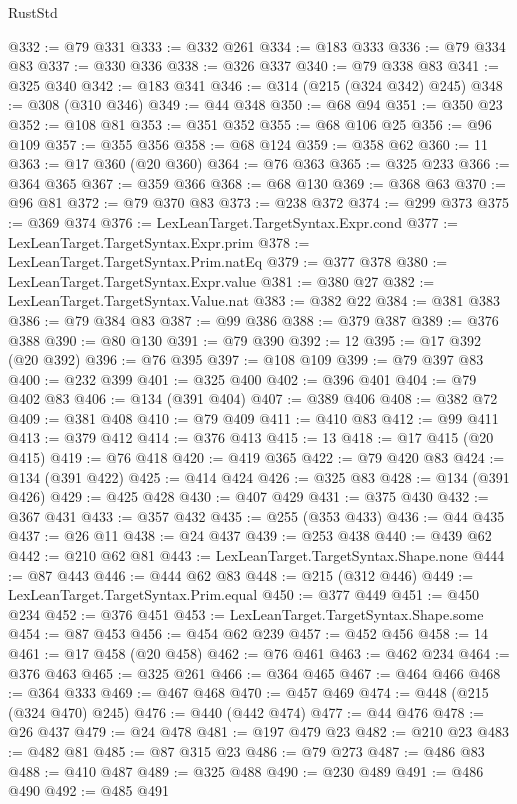 \begin{lexlean}{RustStd}
\begin{coremodule}
@332 := @79 @331
@333 := @332 @261
@334 := @183 @333
@336 := @79 @334 @83
@337 := @330 @336
@338 := @326 @337
@340 := @79 @338 @83
@341 := @325 @340
@342 := @183 @341
@346 := @314 (@215 (@324 @342) @245)
@348 := @308 (@310 @346)
@349 := @44 @348
@350 := @68 @94
@351 := @350 @23
@352 := @108 @81
@353 := @351 @352
@355 := @68 @106 @25
@356 := @96 @109
@357 := @355 @356
@358 := @68 @124
@359 := @358 @62
@360 := 11
@363 := @17 @360 (@20 @360)
@364 := @76 @363
@365 := @325 @233
@366 := @364 @365
@367 := @359 @366
@368 := @68 @130
@369 := @368 @63
@370 := @96 @81
@372 := @79 @370 @83
@373 := @238 @372
@374 := @299 @373
@375 := @369 @374
@376 := LexLeanTarget.TargetSyntax.Expr.cond
@377 := LexLeanTarget.TargetSyntax.Expr.prim
@378 := LexLeanTarget.TargetSyntax.Prim.natEq
@379 := @377 @378
@380 := LexLeanTarget.TargetSyntax.Expr.value
@381 := @380 @27
@382 := LexLeanTarget.TargetSyntax.Value.nat
@383 := @382 @22
@384 := @381 @383
@386 := @79 @384 @83
@387 := @99 @386
@388 := @379 @387
@389 := @376 @388
@390 := @80 @130
@391 := @79 @390
@392 := 12
@395 := @17 @392 (@20 @392)
@396 := @76 @395
@397 := @108 @109
@399 := @79 @397 @83
@400 := @232 @399
@401 := @325 @400
@402 := @396 @401
@404 := @79 @402 @83
@406 := @134 (@391 @404)
@407 := @389 @406
@408 := @382 @72
@409 := @381 @408
@410 := @79 @409
@411 := @410 @83
@412 := @99 @411
@413 := @379 @412
@414 := @376 @413
@415 := 13
@418 := @17 @415 (@20 @415)
@419 := @76 @418
@420 := @419 @365
@422 := @79 @420 @83
@424 := @134 (@391 @422)
@425 := @414 @424
@426 := @325 @83
@428 := @134 (@391 @426)
@429 := @425 @428
@430 := @407 @429
@431 := @375 @430
@432 := @367 @431
@433 := @357 @432
@435 := @255 (@353 @433)
@436 := @44 @435
@437 := @26 @11
@438 := @24 @437
@439 := @253 @438
@440 := @439 @62
@442 := @210 @62 @81
@443 := LexLeanTarget.TargetSyntax.Shape.none
@444 := @87 @443
@446 := @444 @62 @83
@448 := @215 (@312 @446)
@449 := LexLeanTarget.TargetSyntax.Prim.equal
@450 := @377 @449
@451 := @450 @234
@452 := @376 @451
@453 := LexLeanTarget.TargetSyntax.Shape.some
@454 := @87 @453
@456 := @454 @62 @239
@457 := @452 @456
@458 := 14
@461 := @17 @458 (@20 @458)
@462 := @76 @461
@463 := @462 @234
@464 := @376 @463
@465 := @325 @261
@466 := @364 @465
@467 := @464 @466
@468 := @364 @333
@469 := @467 @468
@470 := @457 @469
@474 := @448 (@215 (@324 @470) @245)
@476 := @440 (@442 @474)
@477 := @44 @476
@478 := @26 @437
@479 := @24 @478
@481 := @197 @479 @23
@482 := @210 @23
@483 := @482 @81
@485 := @87 @315 @23
@486 := @79 @273
@487 := @486 @83
@488 := @410 @487
@489 := @325 @488
@490 := @230 @489
@491 := @486 @490
@492 := @485 @491

\end{coremodule}
\end{lexlean}
